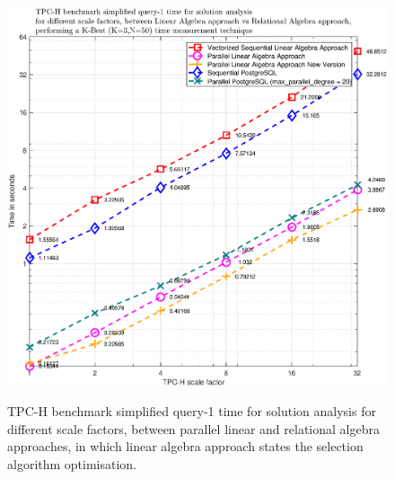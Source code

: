 \begin{figure}[H]
\centering
\caption{TPC-H benchmark simplified query-1 time for solution analysis for different scale factors, between parallel linear and relational algebra approaches, in which linear algebra approach states the selection algorithm optimisation.}
\includegraphics[width=0.95\columnwidth]{eps/TIME_LA_vs_RA_parallel_v2.eps}
\label{fig:time_la_vs_ra_parallel_v2}
\end{figure}



